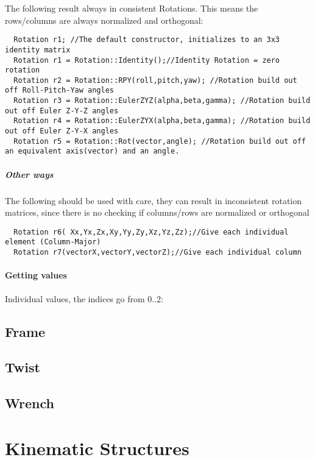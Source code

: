 \documentclass[a4paper,10pt]{report}
\begin{document}
The following result always in consistent Rotations. This means the
rows/columns are always normalized and orthogonal:

\begin{lstlisting}
  Rotation r1; //The default constructor, initializes to an 3x3 identity matrix
  Rotation r1 = Rotation::Identity();//Identity Rotation = zero rotation
  Rotation r2 = Rotation::RPY(roll,pitch,yaw); //Rotation build out off Roll-Pitch-Yaw angles
  Rotation r3 = Rotation::EulerZYZ(alpha,beta,gamma); //Rotation build out off Euler Z-Y-Z angles
  Rotation r4 = Rotation::EulerZYX(alpha,beta,gamma); //Rotation build out off Euler Z-Y-X angles
  Rotation r5 = Rotation::Rot(vector,angle); //Rotation build out off an equivalent axis(vector) and an angle.
\end{lstlisting}

\subparagraph{Other ways}
\label{sec:other-ways}
The following should be used with care, they can result in
inconsistent rotation matrices, since there is no checking if
columns/rows are normalized or orthogonal
\begin{lstlisting}
  Rotation r6( Xx,Yx,Zx,Xy,Yy,Zy,Xz,Yz,Zz);//Give each individual element (Column-Major)
  Rotation r7(vectorX,vectorY,vectorZ);//Give each individual column
\end{lstlisting}

\paragraph{Getting values}
\label{sec:getting-values}
Individual values, the indices go from 0..2: 

\subsection{Frame}
\label{sec:frame}

\subsection{Twist}
\label{sec:twist}

\subsection{Wrench}
\label{sec:wrench}


\section{Kinematic Structures}
\label{sec:kinematic-structures}
\end{document}

